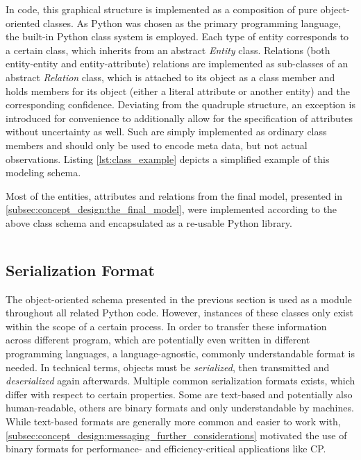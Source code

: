 In code, this graphical structure is implemented as a composition of pure object-oriented classes. As Python was chosen as the primary programming language, the built-in Python class system is employed. Each type of entity corresponds to a certain class, which inherits from an abstract \textit{Entity} class. Relations (both entity-entity and entity-attribute) relations are implemented as sub-classes of an abstract \textit{Relation} class, which is attached to its object as a class member and holds members for its object (either a literal attribute or another entity) and the corresponding confidence. Deviating from the quadruple structure, an exception is introduced for convenience to additionally allow for the specification of attributes without uncertainty as well. Such are simply implemented as ordinary class members and should only be used to encode meta data, but not actual observations. Listing \ref{lst:class_example} depicts a simplified example of this modeling schema.

Most of the entities, attributes and relations from the final model, presented in \autoref{subsec:concept_design:the_final_model}, were implemented according to the above class schema and encapsulated as a re-usable Python library.

\inputminted[fontsize=\footnotesize]{python}{97_listings/class_example.py}
\label{lst:class_example}

\subsection{Serialization Format}
\label{subsec:implementation:serialization_format}
The object-oriented schema presented in the previous section is used as a module throughout all related Python code. However, instances of these classes only exist within the scope of a certain process. In order to transfer these information across different program, which are potentially even written in different programming languages, a language-agnostic, commonly understandable format is needed. In technical terms, objects must be \textit{serialized}, then transmitted and \textit{deserialized} again afterwards. Multiple common serialization formats exists, which differ with respect to certain properties. Some are text-based and potentially also human-readable, others are binary formats and only understandable by machines. While text-based formats are generally more common and easier to work with, \autoref{subsec:concept_design:messaging_further_considerations} motivated the use of binary formats for performance- and efficiency-critical applications like CP.

